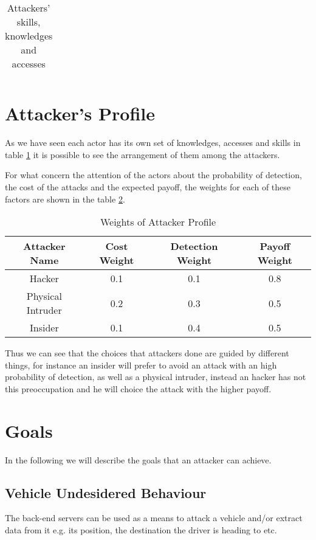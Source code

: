 \begin{table}[H]
\begin{tabular}{|c|c|c|c|}
	\end{tabular}
	\caption{Attackers' skills, knowledges and accesses}
	\label{tab:profiles}
\end{table}

\section{Attacker's Profile}
\noindent As we have seen each actor has its own set of knowledges, accesses and skills in table \ref{tab:profiles} it is possible to see the arrangement of them among the attackers.


\noindent For what concern the attention of the actors about the probability of detection, the cost of the attacks and the expected payoff, the weights for each of these factors are shown in the table \ref{tab:weights}.

\begin{table}[htpb]
	\centering
	\begin{tabular}{|c|c|c|c|}
		\hline
		\textbf{Attacker Name} & \textbf{Cost Weight} & \textbf{Detection Weight} & \textbf{Payoff Weight} \\ \hline
		Hacker                 & 0.1                    & 0.1                       & 0.8                    \\ \hline
		Physical Intruder      & 0.2                  & 0.3                       & 0.5                    \\ \hline
		Insider                & 0.1                  & 0.4                       & 0.5                    \\ \hline
	\end{tabular}
	\caption{Weights of Attacker Profile}
	\label{tab:weights}
\end{table}

\noindent  Thus we can see that the choices that attackers done are guided by different things, for instance an insider will prefer to avoid an attack with an high probability of detection, as well as a physical intruder, instead an hacker has not this preoccupation and he will choice the attack with the higher payoff.

\section{Goals}

\noindent In the following we will describe the goals that an attacker can achieve.

\subsection*{Vehicle Undesidered Behaviour}
The back-end servers can be used as a means to attack a vehicle and/or extract data from it e.g. its position, the destination the driver is heading to etc.


